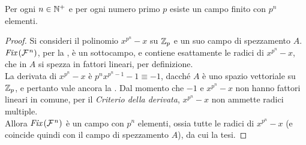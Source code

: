 \begin{theorem}
    Per ogni $n \in \mathbb N^+$ e per ogni numero primo $p$ esiste un
    campo finito con $p^n$ elementi.
\end{theorem}

\begin{proof}
    Si consideri il polinomio $x^{p^n}-x$ su $\mathbb{Z}_p$ e un suo
    campo di spezzamento $A$. $\operatorname{\textit{Fix}\,}(\mathcal{F}{\mkern 1.5mu}^n)$, per
    la , è
    un sottocampo, e
    contiene esattamente le radici di $x^{p^n}-x$, che
    in $A$ si spezza in fattori lineari, per definizione. \\

    La derivata di $x^{p^n}-x$ è $p^n x^{p^n - 1}-1 \equiv -1$,
    dacché $A$ è uno spazio vettoriale su $\mathbb{Z}_p$, e pertanto
    vale ancora la .
    Dal momento che $-1$ e $x^{p^n}-x$ non hanno fattori lineari
    in comune, per il \textit{Criterio della derivata},
    $x^{p^n}-x$ non ammette radici multiple. \\

    Allora $\operatorname{\textit{Fix}\,}(\mathcal{F}{\mkern 1.5mu}^n)$ è un campo con $p^n$ elementi,
    ossia tutte le radici di $x^{p^n}-x$ (e coincide quindi
    con il campo di spezzamento $A$), da cui la tesi.
\end{proof}
